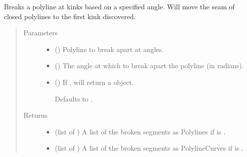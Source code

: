 \documentclass[letterpaper,10pt,english]{sphinxmanual}
\begin{document}

\begin{fulllineitems}
\label{\detokenize{cockatoo:cockatoo.utilities.break_polyline}}
Breaks a polyline at kinks based on a specified angle. Will move the seam
of closed polylines to the first kink discovered.
\begin{quote}\begin{description}
\item[{Parameters}] \leavevmode\begin{itemize}
\item {} 
 () \textendash{} Polyline to break apart at angles.

\item {} 
 () \textendash{} The angle at which to break apart the polyline (in radians).

\item {} 
 (\sphinxstyleliteralemphasis{\sphinxupquote{, }}) \textendash{} 
If , will return a  object.

Defaults to .


\end{itemize}

\item[{Returns}] \leavevmode
\begin{itemize}
\item {} 
 (list of ) \textendash{} A list of the broken segments as Polylines if  is
.

\item {} 
 (list of ) \textendash{} A list of the broken segments as PolylineCurves if  is
.

\end{itemize}


\end{description}\end{quote}

\end{fulllineitems}
\end{document}
